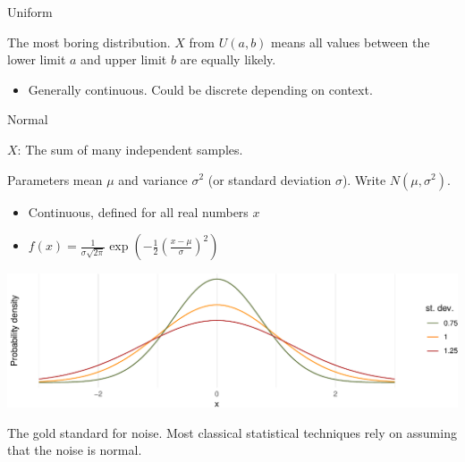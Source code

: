 \documentclass[
  ignorenonframetext,
]{beamer}
\providecommand{\tightlist}{%
  \setlength{\itemsep}{0pt}\setlength{\parskip}{0pt}}
\begin{document}
\begin{frame}{Uniform}
\protect\hypertarget{uniform}{}

The most boring distribution. \(X\) from \(U(a,b)\) means all values
between the lower limit \(a\) and upper limit \(b\) are equally likely.

\begin{itemize}
\tightlist
\item
  Generally continuous. Could be discrete depending on context.
\end{itemize}

\end{frame}

\begin{frame}{Normal}
\protect\hypertarget{normal}{}

\(X\): The sum of many independent samples.

Parameters mean \(\mu\) and variance \(\sigma^2\) (or standard deviation
\(\sigma\)). Write \(N(\mu, \sigma^2)\).

\begin{itemize}
\tightlist
\item
  Continuous, defined for all real numbers \(x\)
\item
  \(f(x)=\displaystyle \frac{1}{\sigma\sqrt{2\pi}}\exp\left(-\frac{1}{2}\left(\frac{x-\mu}{\sigma}\right)^2\right)\)
\end{itemize}

\includegraphics{noise_files/figure-beamer/unnamed-chunk-7-1.pdf}

The gold standard for noise. Most classical statistical techniques rely
on assuming that the noise is normal.

\end{frame}
\end{document}
